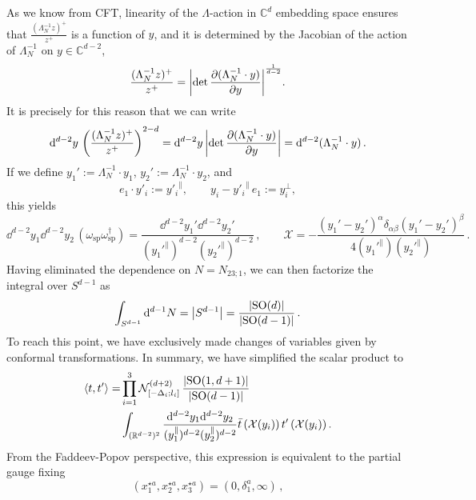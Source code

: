 \documentclass{article}
\def \om {\omega}
\def \Dg {\Delta}
\def \dg {\delta}
\def \ds {\partial}
\def \ag {\alpha}
\def \bg {\beta}
\def \La {\Lambda}
\def \Rs {\mathbb{R}}
\def \Cs {\mathbb{C}}
\begin{document}
As we know from CFT, linearity of the $\La$-action in $\Cs^d$ embedding space ensures that $\frac{(\La_N^{-1} z)^+}{z^+} $ is a function of $y$, and it is determined by the Jacobian of the action of $\La_{N}^{-1}$ on $y \in \Cs^{d-2}$, 
\begin{equation}
 \frac{(\La_N^{-1} z)^+}{z^+} = \abs{\det \frac{\ds(\La_N^{-1} \cdot y)}{\ds y}}^{\frac{1}{d-2}}.
\end{equation}
It is precisely for this reason that we can write 
\begin{equation}
\dd^{d-2} y \,  \left(\frac{(\La_N^{-1} z)^+}{z^+}\right)^{2-d} = \dd^{d-2} y \, \abs{\det \frac{\ds(\La_N^{-1} \cdot y)}{\ds y}} = \dd^{d-2}(\La_N^{-1} \cdot y)\,.
\end{equation}
If we define $y_1':= \La_N^{-1} \cdot y_1$, $y_{2}':= \La_N^{-1} \cdot y_2$, and
\begin{equation}
    e_1 \cdot y'_i := {y'_i}^{\parallel}, \qquad y_i -{y'_i}^{\parallel} \, e_1 := y_i^{\perp}, 
\end{equation}
this yields 
\begin{equation}
\dd^{d-2} y_1 \dd^{d-2}y_2 \, (\om_{\mathrm{sp}}  \om^{\dagger}_{\mathrm{sp}}) = \frac{\dd^{d-2} y_1' \dd^{d-2} y_2'}{(y_1'^{\parallel})^{d-2} (y_2'^{\parallel})^{d-2}}\,, \qquad \mathcal{X} =- \frac{(y_1'-y_2')^{\ag} \dg_{\ag\bg} (y_1'-y_2')^{\bg}}{4(y_1'^{\parallel}) (y_2'^{\parallel})}\,.
\end{equation}
Having eliminated the dependence on $N = N_{23;1}$, we can then factorize the integral over $S^{d-1}$ as
\begin{equation}
\int_{S^{d-1}} \dd^{d-1} N = \abs{S^{d-1}}= \frac{\abs{\mathrm{SO}(d)}}{\abs{\mathrm{SO}(d-1)}}\,.
\end{equation}
To reach this point, we have exclusively made changes of variables given by conformal transformations. In summary, we have simplified the scalar product to 
\begin{align}
\langle t, t'\rangle =& \prod_{i=1}^3 \mathcal{N}^{(d+2)}_{[-\Dg_i;l_i]} \,  \frac{\abs{\mathrm{SO}(1,d+1)}}{\abs{\mathrm{SO}(d-1)}} \\
& \int_{(\Rs^{d-2})^2} \frac{\dd^{d-2} y_1 \dd^{d-2} y_2}{(y_1^{\parallel})^{d-2} (y_2^{\parallel})^{d-2}} \bar{t} \left(\mathcal{X}(y_i) \right) t'\left(\mathcal{X}(y_i)  \right).
\label{conf_pair_bCFT}
\end{align}
 From the Faddeev-Popov perspective, this expression is equivalent to the partial gauge fixing
\begin{equation}
(x_1^{\star a},x_2^{\star a},x_3^{\star a}) = (0, \dg^a_1, \infty)\,, 
\end{equation}
\end{document}
